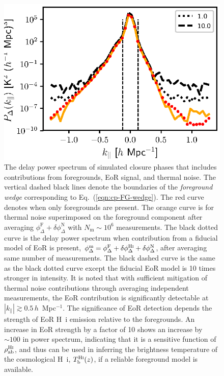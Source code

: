 \documentclass[
reprint,
superscriptaddress,
amsmath,
amssymb,
aps,
prd
]{revtex4-1}
\begin{document}
\begin{figure}[htb]
\includegraphics[width=\linewidth]{cpdps_150MHz_nsamples_1048576}
\caption{The delay power spectrum of simulated closure phases that includes contributions from foregrounds, EoR signal, and thermal noise. The vertical dashed black lines denote the boundaries of the {\it foreground wedge} corresponding to Eq.~(\ref{eqn:cp-FG-wedge}). The red curve denotes when only foregrounds are present. The orange curve is for thermal noise superimposed on the foreground component after averaging $\phi_\Delta^\textrm{F}+\delta\phi_\Delta^\textrm{N}$ with $N_\textrm{m} \sim 10^6$ measurements. The black dotted curve is the delay power spectrum when contribution from a fiducial model of EoR is present, $\phi_\Delta^\textrm{m}=\phi_\Delta^\textrm{F}+\delta\phi_\Delta^\textrm{H{\sc i}}+\delta\phi_\Delta^\textrm{N}$, after averaging same number of measurements. The black dashed curve is the same as the black dotted curve except the fiducial EoR model is 10 times stronger in intensity. It is noted that with sufficient mitigation of thermal noise contributions through averaging independent measurements, the EoR contribution is significantly detectable at $|k_\parallel| \gtrsim 0.5\,h$~Mpc$^{-1}$. The significance of EoR detection depends the strength of EoR H~{\sc i} emission relative to the foregrounds. An increase in EoR strength by a factor of 10 shows an increase by $\sim 100$ in power spectrum, indicating that it is a sensitive function of $\rho_\textrm{ab}^\textrm{H{\sc i}}$, and thus can be used in inferring the brightness temperature of the cosmological H~{\sc i}, $T_\textrm{b}^\textrm{H{\sc i}}(z)$, if a reliable foreground model is available. \label{fig:cpdps}}
\end{figure}
\end{document}
